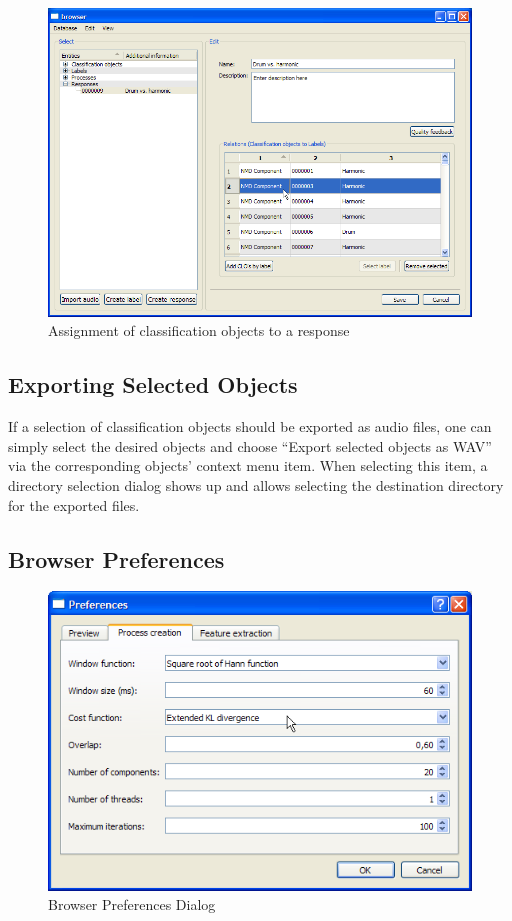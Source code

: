 \begin{figure}
    \includegraphics[width=\textwidth]{images/COAssignment.png}
    \caption{%
        \label{figure:COAssignment}%
        Assignment of classification objects to a response
    }
\end{figure}


\subsection{Exporting Selected Objects}

If a selection of classification objects should be exported as audio files, one
can simply select the desired objects and choose ``Export selected objects as WAV''
via the corresponding objects' context menu item. When selecting this item, a
directory selection dialog shows up and allows selecting the destination
directory for the exported files.


\subsection{Browser Preferences}

\begin{figure}
    \includegraphics[width=\textwidth]{images/BrowserPreferences.png}
    \caption{%
        \label{figure:BrowserPreferences}%
        Browser Preferences Dialog
    }
\end{figure}


